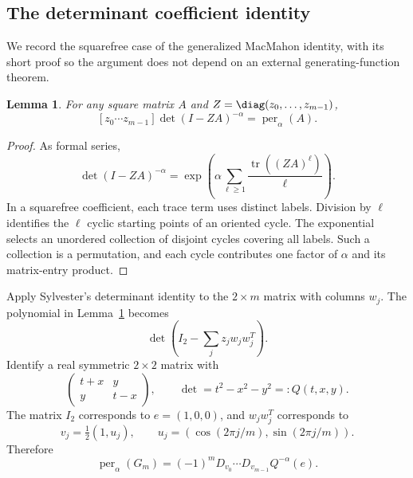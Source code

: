 \documentclass[11pt,a4paper]{article}
\newtheorem{lemma}[theorem]{Lemma}
\theoremstyle{definition}\newtheorem{definition}[theorem]{Definition}
\theoremstyle{remark}\newtheorem{remark}[theorem]{Remark}
\DeclareMathOperator{\tr}{tr}\DeclareMathOperator{\supp}{supp}\DeclareMathOperator{\TV}{TV}
\numberwithin{equation}{section}
\begin{document}
\subsection{The determinant coefficient identity}\label{S07-sec-2}
We record the squarefree case of the generalized MacMahon identity, with its short proof so the argument does not depend on an external generating-function theorem.
\begin{lemma}\label{S07-mac}
For any square matrix $A$ and $Z=\diag(z_0,\ldots,z_{m-1})$,
\[
 [z_0\cdots z_{m-1}]\det(I-ZA)^{-\alpha}
 =\operatorname{per}_\alpha(A).
\]
\end{lemma}
\begin{proof}
As formal series,
\[
 \det(I-ZA)^{-\alpha}
 =\exp\left(\alpha\sum_{\ell\ge1}\frac{\tr((ZA)^\ell)}{\ell}\right).
\]
In a squarefree coefficient, each trace term uses distinct labels. Division by $\ell$ identifies the $\ell$ cyclic starting points of an oriented cycle. The exponential selects an unordered collection of disjoint cycles covering all labels. Such a collection is a permutation, and each cycle contributes one factor of $\alpha$ and its matrix-entry product.
\end{proof}
Apply Sylvester's determinant identity to the $2\times m$ matrix with columns $w_j$. The polynomial in Lemma~\ref{S07-mac} becomes
\[
 \det\left(I_2-\sum_j z_jw_jw_j^T\right).
\]
Identify a real symmetric $2\times2$ matrix with
\[
 \begin{pmatrix}t+x&y\\y&t-x\end{pmatrix},\qquad \det=t^2-x^2-y^2=:Q(t,x,y).
\]
The matrix $I_2$ corresponds to $e=(1,0,0)$, and $w_jw_j^T$ corresponds to
\[
 v_j=\tfrac12(1,u_j),\qquad
 u_j=(\cos(2\pi j/m),\sin(2\pi j/m)).
\]
Therefore
\begin{equation}\label{S07-der}
 \operatorname{per}_\alpha(G_m)=(-1)^mD_{v_0}\cdots D_{v_{m-1}}Q^{-\alpha}(e).
\end{equation}
\end{document}

